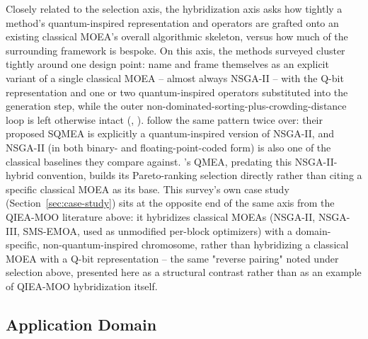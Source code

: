 Closely related to the selection axis, the hybridization axis asks how
tightly a method's quantum-inspired representation and operators are
grafted onto an existing classical MOEA's overall algorithmic skeleton,
versus how much of the surrounding framework is bespoke. On this axis,
the methods surveyed cluster tightly around one design point: name and
frame themselves as an explicit variant of a single classical MOEA --
almost always NSGA-II -- with the Q-bit representation and one or two
quantum-inspired operators substituted into the generation step, while
the outer non-dominated-sorting-plus-crowding-distance loop is left
otherwise intact (\citet{guzel2022qnsga2},
\citet{kumar2026eahqnsga2}). \citet{olvera2023continuous} follow the
same pattern twice over: their proposed SQMEA is explicitly a
quantum-inspired version of NSGA-II, and NSGA-II (in both binary- and
floating-point-coded form) is also one of the classical baselines they
compare against.
\citet{kim2006qmea}'s QMEA, predating this NSGA-II-hybrid convention,
builds its Pareto-ranking selection directly rather than citing a
specific classical MOEA as its base. This survey's own case study
(Section~\ref{sec:case-study}) sits at the opposite end of the same
axis from the QIEA-MOO literature above: it hybridizes classical MOEAs
(NSGA-II, NSGA-III, SMS-EMOA, used as unmodified per-block optimizers)
with a domain-specific, non-quantum-inspired chromosome, rather than
hybridizing a classical MOEA with a Q-bit representation -- the same
"reverse pairing" noted under selection above, presented here as a
structural contrast rather than as an example of QIEA-MOO hybridization
itself.

\subsection{Application Domain}
\label{sec:taxonomy:application}

